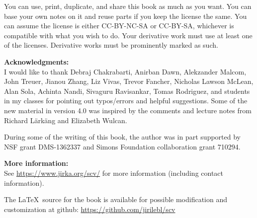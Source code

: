 \documentclass[12pt,openany]{book}
\theoremstyle{plain}
\theoremstyle{remark}
\theoremstyle{definition}
\theoremstyle{exercise}
\theoremstyle{example}
\begin{document}
\bigskip

\noindent
You can use, print, duplicate, and share this book as much as you want.  You can
base your own notes on it and reuse parts if you keep the license the
same.  You can assume the license is either CC-BY-NC-SA or CC-BY-SA\@,
whichever is compatible with what you wish to do.
Your derivative work must use at least one of the licenses.
Derivative works must be prominently marked as such.

\bigskip

\noindent
\textbf{Acknowledgments:}
\\
I would like to thank Debraj Chakrabarti, Anirban Dawn, Alekzander Malcom,
John Treuer, Jianou Zhang, Liz Vivas, Trevor Fancher,
Nicholas Lawson McLean, Alan Sola, Achinta Nandi,
Sivaguru Ravisankar,
Tomas Rodriguez,
and students in my classes for pointing out typos/errors
and helpful suggestions.
Some of the new material in version 4.0
was inspired by the comments and lecture notes from
Richard L\"ark\"ang and Elizabeth Wulcan.

\bigskip

\noindent
During some of the writing of this book,
the author was in part supported by NSF grant DMS-1362337
and Simons Foundation collaboration grant 710294. 

\bigskip

\noindent
\textbf{More information:}
\\
See \url{https://www.jirka.org/scv/} for more information
(including contact information).

\medskip

\noindent
The \LaTeX\ source for the book is available
for possible modification and customization
at github: \url{https://github.com/jirilebl/scv}



\tableofcontents
{}


\end{document}
